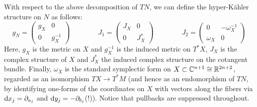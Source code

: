 With respect to the above decomposition of $TN$, we can define the hyper-K\"ahler structure on $N$ as follows:
\begin{equation*}
	g_N=
	\begin{pmatrix}
		g_X & 0 \\ 0 & g_X^{-1}
	\end{pmatrix}
	\qquad \qquad 
	J_1=
	\begin{pmatrix}
		J_X & 0 \\ 0 & J_X^*
	\end{pmatrix}
	\qquad \qquad 
	J_2=
	\begin{pmatrix}
		0 & -\omega_X^{-1} \\ \omega_X & 0
	\end{pmatrix}
\end{equation*}
Here, $g_X$ is the metric on $X$ and $g^{-1}_X$ is the induced metric on $T^*X$, $J_X$ is the complex structure of $X$ and $J^*_X$ the induced complex structure on the cotangent bundle. Finally, $\omega_X$ is the standard symplectic form on $X\subset \mathbb{C}^{n+1}\cong \mathbb{R}^{2n+2}$, regarded as an isomorphism $TX\to T^*M$ (and hence as an endomorphism of $TN$, by identifying one-forms of the coordinates on $X$ with vectors along the fibers via $\mathrm{d} x_j=\partial_{a_j}$ and $\mathrm{d} y_j=-\partial_{b_j}$(!)). Notice that pullbacks are suppressed throughout.

